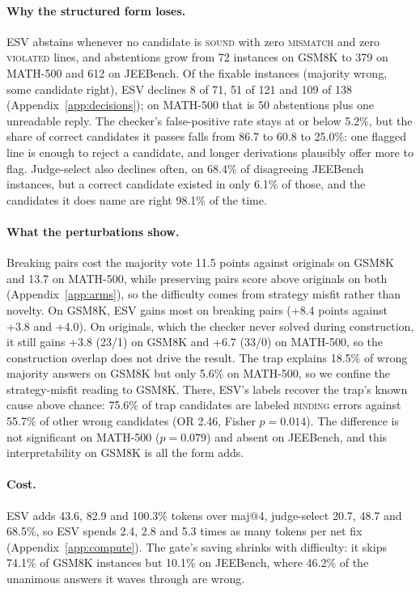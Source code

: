\documentclass[letterpaper]{article} %
\begin{document}
\paragraph{Why the structured form loses.}
ESV abstains whenever no candidate is \textsc{sound} with zero \textsc{mismatch} and zero \textsc{violated} lines, and abstentions grow from 72 instances on GSM8K to 379 on MATH-500 and 612 on JEEBench. Of the fixable instances (majority wrong, some candidate right), ESV declines 8 of 71, 51 of 121 and 109 of 138 (Appendix~\ref{app:decisions}); on MATH-500 that is 50 abstentions plus one unreadable reply. The checker's false-positive rate stays at or below 5.2\%, but the share of correct candidates it passes falls from 86.7 to 60.8 to 25.0\%: one flagged line is enough to reject a candidate, and longer derivations plausibly offer more to flag. Judge-select also declines often, on 68.4\% of disagreeing JEEBench instances, but a correct candidate existed in only 6.1\% of those, and the candidates it does name are right 98.1\% of the time.

\paragraph{What the perturbations show.}
Breaking pairs cost the majority vote 11.5 points against originals on GSM8K and 13.7 on MATH-500, while preserving pairs score above originals on both (Appendix~\ref{app:arms}), so the difficulty comes from strategy misfit rather than novelty. On GSM8K, ESV gains most on breaking pairs (+8.4 points against +3.8 and +4.0). On originals, which the checker never solved during construction, it still gains +3.8 (23/1) on GSM8K and +6.7 (33/0) on MATH-500, so the construction overlap does not drive the result. The trap explains 18.5\% of wrong majority answers on GSM8K but only 5.6\% on MATH-500, so we confine the strategy-misfit reading to GSM8K. There, ESV's labels recover the trap's known cause above chance: 75.6\% of trap candidates are labeled \textsc{binding} errors against 55.7\% of other wrong candidates (OR 2.46, Fisher $p = 0.014$). The difference is not significant on MATH-500 ($p = 0.079$) and absent on JEEBench, and this interpretability on GSM8K is all the form adds.

\paragraph{Cost.}
ESV adds 43.6, 82.9 and 100.3\% tokens over maj@4, judge-select 20.7, 48.7 and 68.5\%, so ESV spends 2.4, 2.8 and 5.3 times as many tokens per net fix (Appendix~\ref{app:compute}). The gate's saving shrinks with difficulty: it skips 74.1\% of GSM8K instances but 10.1\% on JEEBench, where 46.2\% of the unanimous answers it waves through are wrong.
\end{document}
